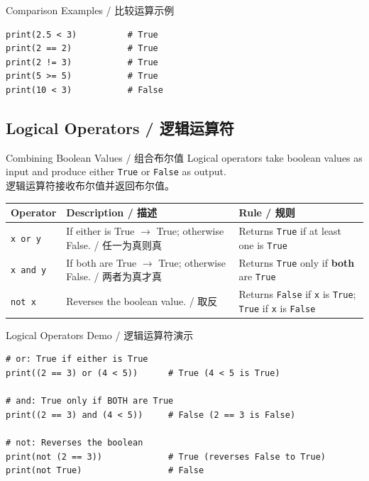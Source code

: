 \documentclass[11pt,a4paper]{article}
\begin{document}
\begin{examplebox}{Comparison Examples / 比较运算示例}
\begin{lstlisting}
print(2.5 < 3)          # True
print(2 == 2)           # True
print(2 != 3)           # True
print(5 >= 5)           # True
print(10 < 3)           # False
\end{lstlisting}
\end{examplebox}

\subsection{Logical Operators / 逻辑运算符}

\begin{concept}{Combining Boolean Values / 组合布尔值}
    Logical operators take boolean values as input and produce either \texttt{True} or \texttt{False} as output. \\
    逻辑运算符接收布尔值并返回布尔值。
\end{concept}

\begin{table}[h]
\centering
\renewcommand{\arraystretch}{1.5}
\begin{tabularx}{\textwidth}{@{}l>{\raggedright\arraybackslash}X>{\raggedright\arraybackslash}X@{}}
\toprule
\textbf{Operator} & \textbf{Description / 描述} & \textbf{Rule / 规则} \\ \midrule
\texttt{x or y}  & If either is True $\rightarrow$ True; otherwise False. / 任一为真则真 & Returns \texttt{True} if at least one is \texttt{True} \\
\texttt{x and y} & If both are True $\rightarrow$ True; otherwise False. / 两者为真才真 & Returns \texttt{True} only if \textbf{both} are \texttt{True} \\
\texttt{not x}   & Reverses the boolean value. / 取反 & Returns \texttt{False} if \texttt{x} is \texttt{True}; \texttt{True} if \texttt{x} is \texttt{False} \\ \bottomrule
\end{tabularx}
\end{table}

\begin{examplebox}{Logical Operators Demo / 逻辑运算符演示}
\begin{lstlisting}
# or: True if either is True
print((2 == 3) or (4 < 5))      # True (4 < 5 is True)

# and: True only if BOTH are True
print((2 == 3) and (4 < 5))     # False (2 == 3 is False)

# not: Reverses the boolean
print(not (2 == 3))             # True (reverses False to True)
print(not True)                 # False
\end{lstlisting}
\end{examplebox}
\end{document}
